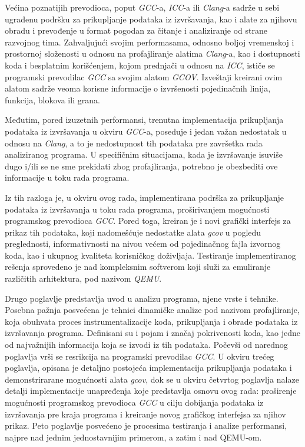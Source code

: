 \documentclass[12pt,oneside]{memoir}
\newcommand{\strano}[1]{\textit{#1}}
\begin{document}
Većina poznatijih prevodioca, poput \strano{GCC}-a, \strano{ICC}-a ili \strano{Clang}-a sadrže u sebi ugrađenu podršku za prikupljanje podataka iz izvršavanja, kao i alate za njihovu obradu i prevođenje u format pogodan za čitanje i analiziranje od strane razvojnog tima. Zahvaljujući svojim performasama, odnosno boljoj vremenskoj i prostornoj složenosti u odnosu na profajliranje alatima \strano{Clang}-a, kao i dostupnosti koda i besplatnim korišćenjem, kojom prednjači u odnosu na \strano{ICC}, ističe se programski prevodilac \strano{GCC} sa svojim alatom \strano{GCOV}. Izveštaji kreirani ovim alatom sadrže veoma korisne informacije o izvršenosti pojedinačnih linija, funkcija, blokova ili grana. 

Međutim, pored izuzetnih performansi, trenutna implementacija prikupljanja podataka iz izvršavanja u okviru \strano{GCC}-a, poseduje i jedan važan nedostatak u odnosu na \strano{Clang}, a to je nedostupnost tih podataka pre završetka rada analiziranog programa. U specifičnim situacijama, kada je izvršavanje isuviše dugo i/ili se ne sme prekidati zbog profajliranja, potrebno je obezbediti ove informacije u toku rada programa.
 
Iz tih razloga je, u okviru ovog rada, implementirana podrška za prikupljanje podataka iz izvršavanja u toku rada programa, proširivanjem mogućnosti programskog prevodioca \strano{GCC}. Pored toga, kreiran je i novi grafički interfejs za prikaz tih podataka, koji nadomešćuje nedostatke alata \strano{gcov} u pogledu preglednosti, informativnosti na nivou većem od pojedinačnog fajla izvornog koda, kao i ukupnog kvaliteta korisničkog doživljaja. Testiranje implementiranog rešenja sprovedeno je nad kompleksnim softverom koji služi za emuliranje različitih arhitektura, pod nazivom \strano{QEMU}. 

Drugo poglavlje predstavlja uvod u analizu programa, njene vrste i tehnike. Posebna pažnja posvećena je tehnici dinamičke analize pod nazivom profajliranje, koja obuhvata proces instrumentalizacije koda, prikupljanja i obrade podataka iz izvršavanja programa. Definisani su i pojam i značaj pokrivenosti koda, kao jedne od najvažnijih informacija koja se izvodi iz tih podataka. Počevši od narednog poglavlja vrši se resrikcija na programski prevodilac \strano{GCC}. U okviru trećeg poglavlja, opisana je detaljno postojeća implementacija prikupljanja podataka i demonstrirarane mogućnosti alata \strano{gcov}, dok se u okviru četvrtog poglavlja nalaze detalji implementacije unapređenja koje predstavlja osnovu ovog rada: proširenje mogućnosti programskog prevodioca \strano{GCC} u cilju dobijanja podataka iz izvršavanja pre kraja programa i kreiranje novog grafičkog interfejsa za njihov prikaz. Peto poglavlje posvećeno je procesima testiranja i analize performansi, najpre nad jednim jednostavnijim primerom, a zatim i nad QEMU-om.
\end{document}
